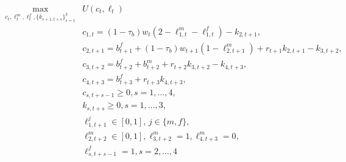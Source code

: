 \begin{equation}
	\label{eq:household-maximization}
	\begin{aligned}	
		\max_{c_t,\ell_t^m,\ell_t^f,\{k_{s+1,t+s}\}_{s=1}^3} & U(c_t,\ell_t) \\
		&c_{1,t}   = (1-\tau_b)w_t (2-\ell_{1,t}^m - \ell_{1,t}^f) -k_{2,t+1} ,\\
		&c_{2,t+1}   = b_{t+1}^f+(1-\tau_b)w_{t+1} (1-\ell_{2,t+1}^m ) + r_{t+1}k_{2,t+1} -k_{3,t+2}  ,\\
		&c_{3,t+2}   = b_{t+2}^f+ b_{t+2}^m  + r_{t+2}k_{3,t+2} -k_{4,t+3}  ,\\
		&c_{4,t+3}  = b_{t+3}^f + r_{t+3}k_{4,t+3} ,\\
		&c_{s,t+s-1}\geq 0, s=1,\ldots,4,\\
		&k_{s,t+s}\geq 0, s=1,\ldots,3,\\
		&\ell_{1,t+1}^j\in [0,1],\, j\in\{m,f\},\\
		&\ell_{2,t+2}^m\in[0,1], \ell_{3,t+2}^m=1,\ell_{4,t+3}^m=0,\\
		&\ell_{s,t+s-1}^f=1,s=2,\ldots,4\\
	\end{aligned}	
\end{equation}

